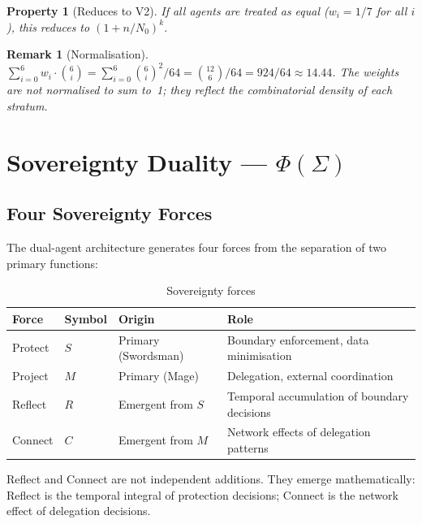 \documentclass[11pt,a4paper]{article}
\newtheorem{property}{Property}[section]
\newtheorem{remark}{Remark}[section]
\begin{document}
\begin{property}[Reduces to V2]
If all agents are treated as equal ($w_i = 1/7$ for all $i$), this reduces to $(1 + n/N_0)^k$.
\end{property}

\begin{remark}[Normalisation]
$\sum_{i=0}^{6} w_i \cdot \binom{6}{i} = \sum_{i=0}^{6} \binom{6}{i}^2/64 = \binom{12}{6}/64 = 924/64 \approx 14.44$. The weights are not normalised to sum to~1; they reflect the combinatorial density of each stratum.
\end{remark}

\section{Sovereignty Duality --- \texorpdfstring{$\Phi(\Sigma)$}{Phi(Sigma)}}
\label{sec:duality}

\subsection{Four Sovereignty Forces}

The dual-agent architecture generates four forces from the separation of two primary functions:

\begin{table}[h]
\centering
\caption{Sovereignty forces}
\begin{tabular}{@{}llll@{}}
\toprule
\textbf{Force} & \textbf{Symbol} & \textbf{Origin} & \textbf{Role} \\
\midrule
Protect & $S$ & Primary (Swordsman) & Boundary enforcement, data minimisation \\
Project & $M$ & Primary (Mage) & Delegation, external coordination \\
Reflect & $R$ & Emergent from $S$ & Temporal accumulation of boundary decisions \\
Connect & $C$ & Emergent from $M$ & Network effects of delegation patterns \\
\bottomrule
\end{tabular}
\end{table}

\noindent Reflect and Connect are not independent additions. They emerge mathematically: Reflect is the temporal integral of protection decisions; Connect is the network effect of delegation decisions.
\end{document}
